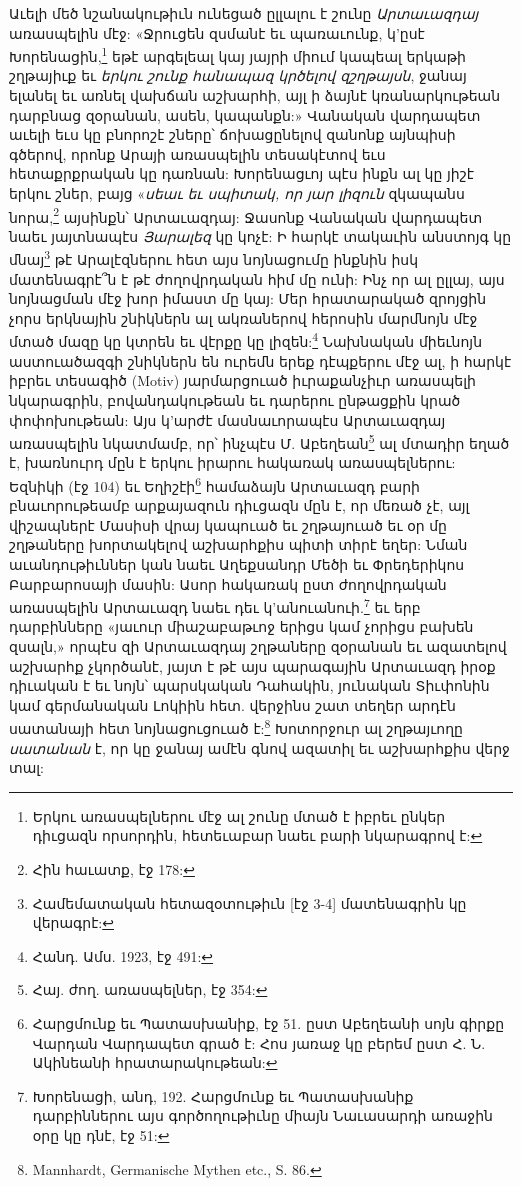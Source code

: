 \documentclass{article}
\begin{document}
{Աւելի մեծ նշանակութիւն ունեցած ըլլալու է շունը \emph{Արտաւազդայ} առասպելին մէջ: «Ջրուցեն զսմանէ եւ պառաւունք, կ'ըսէ Խորենացին,\footnote{Երկու առասպելներու մէջ ալ շունը մտած է իբրեւ ընկեր դիւցազն որսորդին, հետեւաբար նաեւ բարի նկարագրով է:} եթէ արգելեալ կայ յայրի միում կապեալ երկաթի շղթայիւք եւ \emph{երկու շունք հանապազ կրծելով զշղթայսն}, ջանայ ելանել եւ առնել վախճան աշխարհի, այլ ի ձայնէ կռանարկութեան դարբնաց զօրանան, ասեն, կապանքն:» Վանական վարդապետ աւելի եւս կը բնորոշէ շները՝ ճոխացընելով զանոնք այնպիսի գծերով, որոնք Արայի առասպելին տեսակէտով եւս հետաքրքրական կը դառնան: Խորենացւոյ պէս ինքն ալ կը յիշէ երկու շներ, բայց «\emph{սեաւ եւ սպիտակ, որ յար լիզուն} զկապանս նորա,\footnote{Հին հաւատք, էջ 178:} այսինքն՝ Արտաւազդայ: Ջասոնք Վանական վարդապետ նաեւ յայտնապէս \emph{Յարալեզ} կը կոչէ: Ի հարկէ տակաւին անստոյգ կը մնայ\footnote{Համեմատական հետազօտութիւն [էջ 3-4] մատենագրին կը վերագրէ:} թէ Արալէզներու հետ այս նոյնացումը ինքնին իսկ մատենագրէ՞ն է թէ ժողովրդական հիմ մը ունի: Ինչ որ ալ ըլլայ, այս նոյնացման մէջ խոր իմաստ մը կայ: Մեր հրատարակած զրոյցին չորս երկնային շնիկներն ալ ակռաներով հերոսին մարմնոյն մէջ մտած մազը կը կտրեն եւ վէրքը կը լիզեն:\footnote{Հանդ. Ամս. 1923, էջ 491:} Նախնական միեւնոյն աստուածազգի շնիկներն են ուրեմն երեք դէպքերու մէջ ալ, ի հարկէ իբրեւ տեսագիծ (Motiv) յարմարցուած իւրաքանչիւր առասպելի նկարագրին, բովանդակութեան եւ դարերու ընթացքին կրած փոփոխութեան: Այս կ'արժէ մասնաւորապէս Արտաւազդայ առասպելին նկատմամբ, որ՝ ինչպէս Մ. Աբեղեան\footnote{Հայ. ժող. առասպելներ, էջ 354:} ալ մտադիր եղած է, խառնուրդ մըն է երկու իրարու հակառակ առասպելներու: Եզնիկի (էջ 104) եւ Եղիշէի\footnote{Հարցմունք եւ Պատասխանիք, էջ 51. ըստ Աբեղեանի սոյն գիրքը Վարդան Վարդապետ գրած է: Հոս յառաջ կը բերեմ ըստ Հ. Ն. Ակինեանի հրատարակութեան:} համաձայն Արտաւազդ բարի բնաւորութեամբ արքայազուն դիւցազն մըն է, որ մեռած չէ, այլ վիշապներէ Մասիսի վրայ կապուած եւ շղթայուած եւ օր մը շղթաները խորտակելով աշխարհքիս պիտի տիրէ եղեր: Նման աւանդութիւններ կան նաեւ Աղեքսանդր Մեծի եւ Փրեդերիկոս Բարբարոսայի մասին: Ասոր հակառակ ըստ ժողովրդական առասպելին Արտաւազդ նաեւ դեւ կ'անուանուի.\footnote{Խորենացի, անդ, 192. Հարցմունք եւ Պատասխանիք դարբիններու այս գործողութիւնը միայն Նաւասարդի առաջին օրը կը դնէ, էջ 51:} եւ երբ դարբինները «յաւուր միաշաբաթւոջ երիցս կամ չորիցս բախեն զսալն,» որպէս զի Արտաւազդայ շղթաները զօրանան եւ ազատելով աշխարհք չկործանէ, յայտ է թէ այս պարագային Արտաւազդ իրօք դիւական է եւ նոյն՝ պարսկական Դահակին, յունական Տիւփոնին կամ գերմանական Լոկիին հետ. վերջինս շատ տեղեր արդէն սատանայի հետ նոյնացուցուած է:\footnote{Mannhardt, Germanische Mythen etc., S. 86.} Խոտորջուր ալ շղթայւողը \emph{սատանան} է, որ կը ջանայ ամէն գնով ազատիլ եւ աշխարհքիս վերջ տալ:

}
\end{document}
